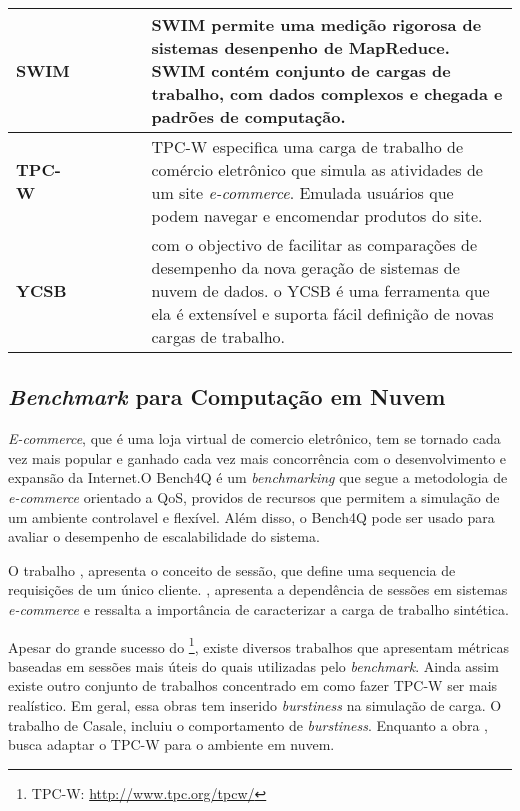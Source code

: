 \begin{center}
\begin{longtable}{| m{2cm} | m{1.5cm} | m{1.7cm} | m{2cm} | m{1.5cm} | p{5.5cm} |}
		\\ 
		\hline
		\textbf{SWIM} & \thereIs & \thereIs & \thereNotIs & \thereIs & SWIM permite uma medição rigorosa de sistemas desenpenho de MapReduce. SWIM contém conjunto de cargas de trabalho, com dados complexos e chegada e padrões de computação. 
		\\ 
		\hline
		\textbf{TPC-W} & \thereIs & \thereIs & \thereIs & \thereIs & TPC-W especifica uma carga de trabalho de comércio eletrônico que simula as atividades de um site \textit{e-commerce}.
		Emulada usuários que podem navegar e encomendar produtos do site. \cite{Menasce2002}
		\\ 		
		\hline
		\textbf{YCSB} & \thereIs & \thereIs & \thereIs & \thereIs & com o objectivo de facilitar as comparações de desempenho da nova geração de sistemas de nuvem de dados. o YCSB é uma ferramenta que ela é extensível e suporta fácil definição de novas cargas de trabalho. \cite{Cooper2010}
		\\ 
		\hline
	\end{longtable}
\end{center}

\subsection{\textit{Benchmark} para Computação em Nuvem}
\label{sec-benchmark-web}

\textit{E-commerce}, que é uma loja virtual de comercio eletrônico, tem se tornado cada vez mais popular e ganhado cada vez mais concorrência com o desenvolvimento e expansão da Internet.O Bench4Q é um \textit{benchmarking} que segue a metodologia de \textit{e-commerce} orientado a QoS, providos de recursos que permitem a simulação de um ambiente controlavel e flexível. Além disso, o Bench4Q pode ser usado para avaliar o desempenho de escalabilidade do sistema.

O trabalho \cite{cherkasova1998}, apresenta o conceito de sessão, que define uma sequencia de requisições de um único cliente. \cite{Krishnamurthy2006}, apresenta a dependência de sessões em sistemas \textit{e-commerce} e ressalta a importância de caracterizar a carga de trabalho sintética.

Apesar do grande sucesso do  \footnote{TPC-W: \url{http://www.tpc.org/tpcw/}}, existe diversos trabalhos que apresentam métricas baseadas em sessões mais úteis do quais utilizadas pelo \textit{benchmark}. Ainda assim existe outro conjunto de trabalhos concentrado em como fazer TPC-W ser mais realístico. Em geral, essa obras tem inserido \textit{burstiness} na simulação de carga. O trabalho \cite{Mi2009} de Casale, incluiu o comportamento de \textit{burstiness}. Enquanto a obra \cite{Sobel2008}, busca adaptar o TPC-W para o ambiente em nuvem.


